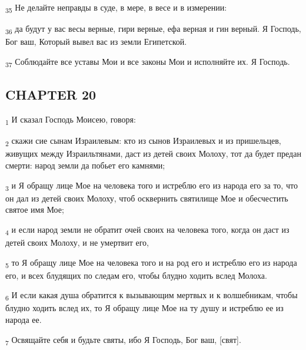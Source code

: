 \begin{tcolorbox}
\textsubscript{35} Не делайте неправды в суде, в мере, в весе и в измерении:
\end{tcolorbox}
\begin{tcolorbox}
\textsubscript{36} да будут у вас весы верные, гири верные, ефа верная и гин верный. Я Господь, Бог ваш, Который вывел вас из земли Египетской.
\end{tcolorbox}
\begin{tcolorbox}
\textsubscript{37} Соблюдайте все уставы Мои и все законы Мои и исполняйте их. Я Господь.
\end{tcolorbox}
\subsection{CHAPTER 20}
\begin{tcolorbox}
\textsubscript{1} И сказал Господь Моисею, говоря:
\end{tcolorbox}
\begin{tcolorbox}
\textsubscript{2} скажи сие сынам Израилевым: кто из сынов Израилевых и из пришельцев, живущих между Израильтянами, даст из детей своих Молоху, тот да будет предан смерти: народ земли да побьет его камнями;
\end{tcolorbox}
\begin{tcolorbox}
\textsubscript{3} и Я обращу лице Мое на человека того и истреблю его из народа его за то, что он дал из детей своих Молоху, чтоб осквернить святилище Мое и обесчестить святое имя Мое;
\end{tcolorbox}
\begin{tcolorbox}
\textsubscript{4} и если народ земли не обратит очей своих на человека того, когда он даст из детей своих Молоху, и не умертвит его,
\end{tcolorbox}
\begin{tcolorbox}
\textsubscript{5} то Я обращу лице Мое на человека того и на род его и истреблю его из народа его, и всех блудящих по следам его, чтобы блудно ходить вслед Молоха.
\end{tcolorbox}
\begin{tcolorbox}
\textsubscript{6} И если какая душа обратится к вызывающим мертвых и к волшебникам, чтобы блудно ходить вслед их, то Я обращу лице Мое на ту душу и истреблю ее из народа ее.
\end{tcolorbox}
\begin{tcolorbox}
\textsubscript{7} Освящайте себя и будьте святы, ибо Я Господь, Бог ваш, [свят].
\end{tcolorbox}
